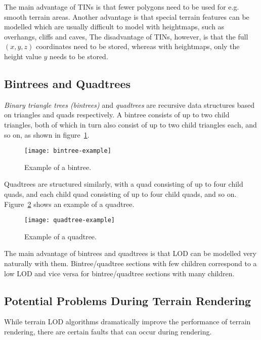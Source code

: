 The main advantage of TINs is that fewer polygons need to be used for 
e.g. smooth terrain areas. Another advantage is that
special terrain features can be modelled 
which are usually difficult to model with heightmaps, such as overhangs, cliffs and caves, 
The disadvantage of TINs, however, is that the full $(x,y,z)$ coordinates need to be stored,
whereas with heightmaps, only the height value $y$ needs to be stored.

\subsection{Bintrees and Quadtrees}
\textit{Binary triangle trees (bintrees)} and \textit{quadtrees} are 
recursive data structures based on triangles and quads respectively.
A bintree consists of up to two child triangles, both of which in turn also consist of up to two child triangles each, and so on,
as shown in figure~\ref{fig:bintree-example}.

\begin{figure}
  \centering
  \texttt{[image: bintree-example]}
  \caption{Example of a bintree.}\label{fig:bintree-example}
\end{figure}

Quadtrees are structured similarly, with a quad consisting of up to four child quads, and each child quad consisting
of up to four child quads, and so on.
Figure~\ref{fig:quadtree-example} shows an example of a quadtree.

\begin{figure}
  \centering
  \texttt{[image: quadtree-example]}
  \caption{Example of a quadtree.}\label{fig:quadtree-example}
\end{figure}

The main advantage of bintrees and quadtrees is that 
LOD can be modelled very naturally with them.
Bintree/quadtree sections with few children correspond to a low LOD and 
vice versa for bintree/quadtree sections with many children.

\subsection{Potential Problems During Terrain Rendering}
While terrain LOD algorithms dramatically improve the performance of terrain rendering, 
there are certain faults that can occur during rendering. 


